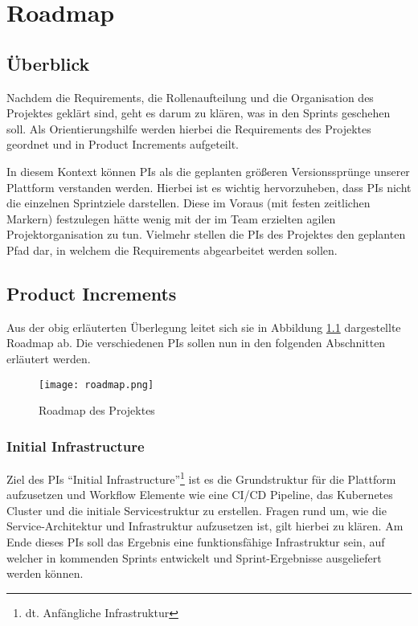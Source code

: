 
\chapter{Roadmap}

\section{Überblick}
Nachdem die Requirements, die Rollenaufteilung und die Organisation des Projektes geklärt sind, geht es darum zu klären, was in den Sprints geschehen soll.
Als Orientierungshilfe werden hierbei die Requirements des Projektes geordnet und in Product Increments aufgeteilt.

In diesem Kontext können \acp{PI} als die geplanten größeren Versionssprünge unserer Plattform verstanden werden.
Hierbei ist es wichtig hervorzuheben, dass \acp{PI} nicht die einzelnen Sprintziele darstellen.
Diese im Voraus (mit festen zeitlichen Markern) festzulegen hätte wenig mit der im Team erzielten agilen Projektorganisation zu tun.
Vielmehr stellen die \acp{PI} des Projektes den geplanten Pfad dar, in welchem die Requirements abgearbeitet werden sollen.

\section{Product Increments}
Aus der obig erläuterten Überlegung leitet sich sie in Abbildung \ref{fig:roadmap} dargestellte Roadmap ab.
Die verschiedenen \acp{PI} sollen nun in den folgenden Abschnitten erläutert werden.

\begin{figure}
    \centering
    \texttt{[image: roadmap.png]}
    \caption{Roadmap des Projektes}
    \label{fig:roadmap}
\end{figure}

\subsection{Initial Infrastructure} \label{initial_infra}
Ziel des \acp{PI} \enquote{Initial Infrastructure}\footnote{dt. Anfängliche Infrastruktur} ist es die Grundstruktur für die Plattform aufzusetzen und Workflow Elemente wie eine \ac{CI/CD} Pipeline, das Kubernetes Cluster und die initiale Servicestruktur zu erstellen.
Fragen rund um, wie die Service-Architektur und Infrastruktur aufzusetzen ist, gilt hierbei zu klären.
Am Ende dieses \acp{PI} soll das Ergebnis eine funktionsfähige Infrastruktur sein, auf welcher in kommenden Sprints entwickelt und Sprint-Ergebnisse ausgeliefert werden können.

